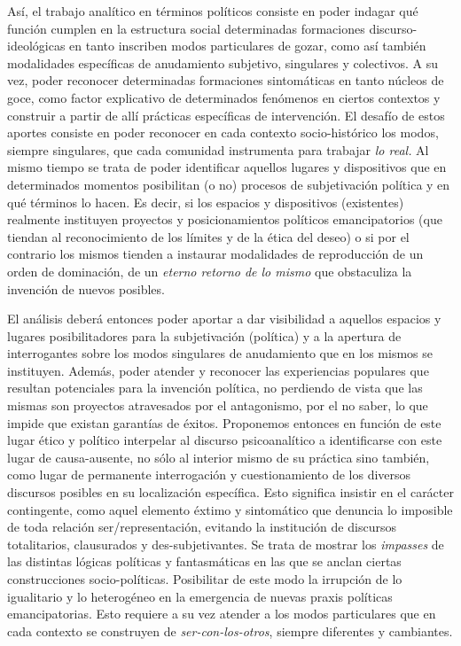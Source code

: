 Así, el trabajo analítico en términos políticos consiste en poder indagar qué función cumplen en la estructura social determinadas formaciones discurso-ideológicas en tanto inscriben modos particulares de gozar, como así también modalidades específicas de anudamiento subjetivo, singulares y colectivos. A su vez, poder reconocer determinadas formaciones sintomáticas en tanto núcleos de goce, como factor explicativo de determinados fenómenos en ciertos contextos y construir a partir de allí prácticas específicas de intervención. El desafío de estos aportes consiste en poder reconocer en cada contexto socio-histórico los modos, siempre singulares, que cada comunidad instrumenta para trabajar \emph{lo real. }Al mismo tiempo se trata de poder identificar aquellos lugares y dispositivos que en determinados momentos posibilitan (o no) procesos de subjetivación política y en qué términos lo hacen. Es decir, si los espacios y dispositivos (existentes) realmente instituyen proyectos y posicionamientos políticos emancipatorios (que tiendan al reconocimiento de los límites y de la ética del deseo) o si por el contrario los mismos tienden a instaurar modalidades de reproducción de un orden de dominación, de un \emph{eterno retorno de lo mismo} que obstaculiza la invención de nuevos posibles.

El análisis deberá entonces poder aportar a dar visibilidad a aquellos espacios y lugares posibilitadores para la subjetivación (política) y a la apertura de interrogantes sobre los modos singulares de anudamiento que en los mismos se instituyen. Además, poder atender y reconocer las experiencias populares que resultan potenciales para la invención política, no perdiendo de vista que las mismas son proyectos atravesados por el antagonismo, por el no saber, lo que impide que existan garantías de éxitos. Proponemos entonces en función de este lugar ético y político interpelar al discurso psicoanalítico a identificarse con este lugar de causa-ausente, no sólo al interior mismo de su práctica sino también, como lugar de permanente interrogación y cuestionamiento de los diversos discursos posibles en su localización específica. Esto significa insistir en el carácter contingente, como aquel elemento éxtimo y sintomático que denuncia lo imposible de toda relación ser/representación, evitando la institución de discursos totalitarios, clausurados y des-subjetivantes. Se trata de mostrar los \emph{impasses} de las distintas lógicas políticas y fantasmáticas en las que se anclan ciertas construcciones socio-políticas. Posibilitar de este modo la irrupción de lo igualitario y lo heterogéneo en la emergencia de nuevas praxis políticas emancipatorias. Esto requiere a su vez atender a los modos particulares que en cada contexto se construyen de \emph{ser-con-los-otros}, siempre diferentes y cambiantes.

